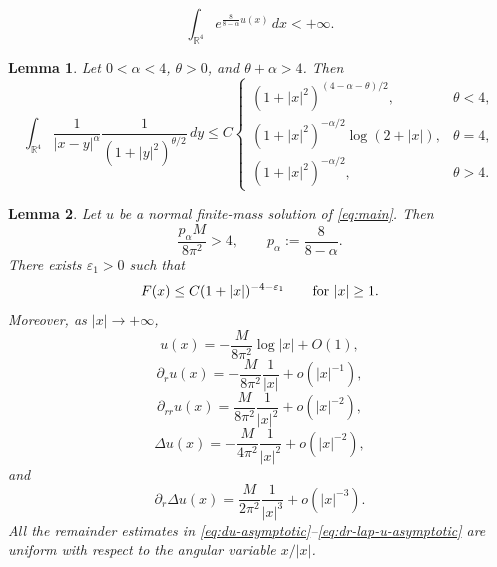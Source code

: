 \documentclass[10pt,a4paper]{amsart}
\newtheorem{lemma}{Lemma}
\begin{document}
\begin{equation}\label{eq:finite-mass}
\int_{\mathbb R^{4}}e^{\frac{8}{8-\alpha}u(x)}\,dx<+\infty.
\end{equation}

\begin{lemma}\label{lem:Riesz-estimate}
Let \(0<\alpha<4\), \(\theta>0\), and \(\theta+\alpha>4\). Then
\[
\int_{\mathbb R^{4}}
\frac{1}{|x-y|^{\alpha}}
\frac{1}{(1+|y|^{2})^{\theta/2}}\,dy
\leq C
\begin{cases}
(1+|x|^{2})^{(4-\alpha-\theta)/2},&\theta<4,\\
(1+|x|^{2})^{-\alpha/2}\log(2+|x|),&\theta=4,\\
(1+|x|^{2})^{-\alpha/2},&\theta>4.
\end{cases}
\]
\end{lemma}

\begin{lemma}\label{lem:normal-asymptotics}
Let \(u\) be a normal finite-mass solution of \eqref{eq:main}. Then
\begin{equation}\label{eq:strict-mass-lower}
\frac{p_{\alpha}M}{8\pi^{2}}>4,
\qquad p_{\alpha}:=\frac{8}{8-\alpha}.
\end{equation}
There exists \(\varepsilon_{1}>0\) such that
\begin{equation}\label{eq:F-tail-decay}
F(x)\leq C(1+|x|)^{-4-\varepsilon_{1}}
\qquad\hbox{for }|x|\geq1.
\end{equation}
Moreover, as \(|x|\to+\infty\),
\begin{equation}\label{eq:u-asymptotic}
u(x)=-\frac{M}{8\pi^{2}}\log|x|+O(1),
\end{equation}
\begin{equation}\label{eq:du-asymptotic}
\partial_{r}u(x)=-\frac{M}{8\pi^{2}}\frac1{|x|}+o(|x|^{-1}),
\end{equation}
\begin{equation}\label{eq:drr-u-asymptotic}
\partial_{rr}u(x)=\frac{M}{8\pi^{2}}\frac1{|x|^{2}}+o(|x|^{-2}),
\end{equation}
\begin{equation*}
\Delta u(x)=-\frac{M}{4\pi^{2}}\frac1{|x|^{2}}+o(|x|^{-2}),
\end{equation*}
and
\begin{equation}\label{eq:dr-lap-u-asymptotic}
\partial_{r}\Delta u(x)=\frac{M}{2\pi^{2}}\frac1{|x|^{3}}+o(|x|^{-3}).
\end{equation}
All the remainder estimates in \eqref{eq:du-asymptotic}--\eqref{eq:dr-lap-u-asymptotic} are uniform with respect to the angular variable \(x/|x|\).
\end{lemma}
\end{document}
